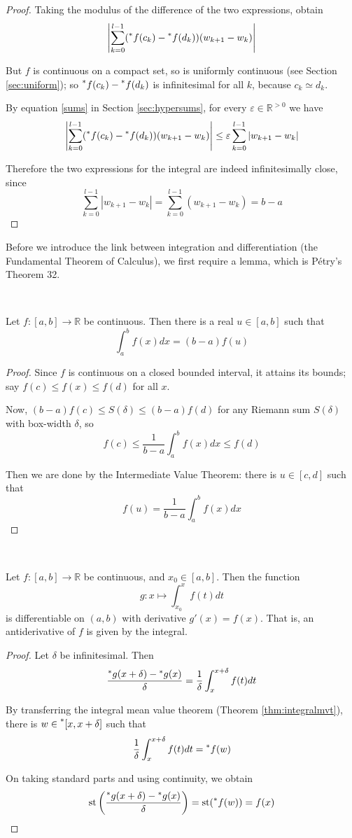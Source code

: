 \documentclass[11pt]{amsart}
\theoremstyle{remark}
\newcommand{\st}{\mathrm{st}}
\newcommand{\hyp}[1][\mathbb{R}]{\prescript{*}{}{#1}}
\newcommand{\near}{\simeq}
\begin{document}
\begin{proof}
Taking the modulus of the difference of the two expressions, obtain $$\left \vert \sum_{k=0}^{l-1} (\hyp[f](c_k) - \hyp[f](d_k)) (w_{k+1} - w_k) \right \vert$$

But $f$ is continuous on a compact set, so is uniformly continuous (see Section \ref{sec:uniform}); so $\hyp[f](c_k) - \hyp[f](d_k)$ is infinitesimal for all $k$, because $c_k \near d_k$.

By equation \ref{sums} in Section \ref{sec:hypersums}, for every $\varepsilon \in \mathbb{R}^{> 0}$ we have
$$\left \vert \sum_{k=0}^{l-1} (\hyp[f](c_k) - \hyp[f](d_k)) (w_{k+1} - w_k) \right \vert \leq \varepsilon \sum_{k=0}^{l-1} |w_{k+1} - w_k|$$

Therefore the two expressions for the integral are indeed infinitesimally close, since $$\sum_{k=0}^{l-1} |w_{k+1}-w_k| = \sum_{k=0}^{l-1} (w_{k+1}-w_k) = b-a$$
\end{proof}

Before we introduce the link between integration and differentiation (the Fundamental Theorem of Calculus), we first require a lemma, which is P\'etry's Theorem 32.

\

\begin{thm} \label{thm:integralmvt}
Let $f: [a, b] \to \mathbb{R}$ be continuous.
Then there is a real $u \in [a,b]$ such that $$\int_a^b f(x) dx = (b-a) f(u)$$
\end{thm}
\begin{proof}
Since $f$ is continuous on a closed bounded interval, it attains its bounds; say $f(c) \leq f(x) \leq f(d)$ for all $x$.

Now, $(b-a) f(c) \leq S(\delta) \leq (b-a) f(d)$
for any Riemann sum $S(\delta)$ with box-width $\delta$, so $$f(c) \leq \frac{1}{b-a} \int_a^b f(x) dx \leq f(d)$$

Then we are done by the Intermediate Value Theorem: there is $u \in [c, d]$ such that $$f(u) = \frac{1}{b-a} \int_a^b f(x) dx$$
\end{proof}

\

\begin{thm} \label{thm:FTC1}
Let $f: [a,b] \to \mathbb{R}$ be continuous, and $x_0 \in [a,b]$.
Then the function $$g: x \mapsto \int_{x_0}^x f(t) dt$$ is differentiable on $(a,b)$ with derivative $g'(x) = f(x)$.
That is, an antiderivative of $f$ is given by the integral.
\end{thm}
\begin{proof}
Let $\delta$ be infinitesimal.
Then $$\frac{\hyp[g](x+\delta) - \hyp[g](x)}{\delta} = \frac{1}{\delta} \int_x^{x+\delta} f(t) dt$$

By transferring the integral mean value theorem (Theorem \ref{thm:integralmvt}), there is $w \in \hyp[[]x, x+\delta]$ such that $$\frac{1}{\delta} \int_x^{x+\delta} f(t) dt = \hyp[f](w)$$

On taking standard parts and using continuity, we obtain $$\st \left( \frac{\hyp[g](x+\delta) - \hyp[g](x)}{\delta} \right) = \st(\hyp[f](w)) = f(x)$$
\end{proof}
\end{document}
